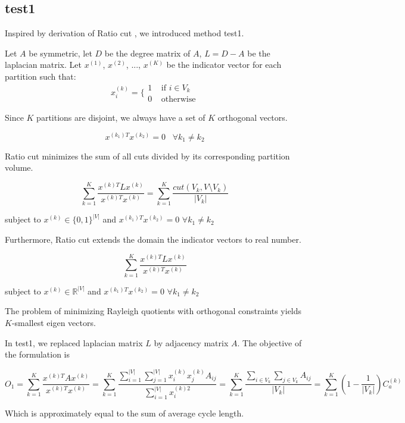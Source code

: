 \subsection{test1}

Inspired by derivation of Ratio cut \cite{gallier}, we introduced method test1.

Let $A$ be symmetric, let $D$ be the degree matrix of $A$, $L = D - A$ be the laplacian matrix.
Let $x^{(1)}$, $x^{(2)}$, ..., $x^{(K)}$ be the indicator vector for each partition such that:
\[
x^{(k)}_i = \{
        \begin{array}{ll}
            1 \;\;\;\; \text{if $i \in V_k$}\\
            0 \;\;\;\; \text{otherwise}
        \end{array}
\]

Since $K$ partitions are disjoint, we always have a set of $K$ orthogonal vectors.

\[
x^{(k_1)T} x^{(k_2)} = 0 \;\;\; \forall k_1 \neq k_2
\]


Ratio cut minimizes the sum of all cuts divided by its corresponding partition volume.

\[
\sum_{k=1}^{K} \frac{x^{(k)T} L x^{(k)}}{x^{(k)T} x^{(k)}}
=
\sum_{k=1}^{K} \frac{cut(V_k, V \setminus V_k)}{|V_k|}
\]

subject to $x^{(k)} \in \{0, 1\}^{|V|}$ and $x^{(k_1)T} x^{(k_2)} = 0$ $\forall k_1 \neq k_2$

Furthermore, Ratio cut extends the domain the indicator vectors to real number.

\[
\sum_{k=1}^{K} \frac{x^{(k)T} L x^{(k)}}{x^{(k)T} x^{(k)}}
\]

subject to $x^{(k)} \in \mathbb{R}^{|V|}$ and $x^{(k_1)T} x^{(k_2)} = 0$ $\forall k_1 \neq k_2$

The problem of minimizing Rayleigh quotients with orthogonal constraints yields $K$-smallest eigen vectors.

In test1, we replaced laplacian matrix $L$ by adjacency matrix $A$. The objective of the formulation is

\[
O_1 = \sum_{k=1}^{K} \frac{x^{(k)T} A x^{(k)}}{x^{(k)T} x^{(k)}}
=
\sum_{k=1}^{K} \frac{\sum_{i=1}^{|V|} \sum_{j=1}^{|V|} x^{(k)}_i x^{(k)}_j A_{ij}}{\sum_{i=1}^{|V|} x^{(k)2}_i}
=
\sum_{k=1}^{K} \frac{\sum_{i \in V_k} \sum_{j \in V_k} A_{ij}}{|V_k|}
= 
\sum_{k=1}^{K} (1 - \frac{1}{|V_k|}) C_a^{(k)}
\]

Which is approximately equal to the sum of average cycle length.

